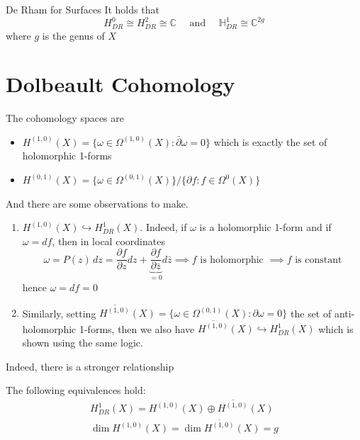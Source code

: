 \begin{theorem}{De Rham for Surfaces}
    It holds that 
    \[
      H^{0}_{DR} \cong H^2_{DR} \cong \mathbb{C} \quad \text{ and } \quad
      \mathbb{H}^{1}_{DR} \cong \mathbb{C}^{2g}
    \]
    where \(g\) is the genus of \(X\) 
\end{theorem}

\section{Dolbeault Cohomology}

The cohomology spaces are
\begin{itemize}[label = --]
    \item \(H^{{(1,0)}}{(X)} = \{\omega \in \Omega^{{(1,0)}}{(X)} :
        \bar{\partial}\omega = 0\} \) which is exactly the set of holomorphic
        1-forms
    \item \(H^{{(0,1)}}{(X)} = \{\omega \in \Omega^{{(0,1)}}{(X)}\} /
        \{\partial f : f \in \Omega^{0}{(X)}\}\) 
\end{itemize}

And there are some observations to make.

\begin{enumerate}[label = \arabic*.]
    \item \(H^{{(1,0)}}{(X)} \hookrightarrow H^{1}_{DR}{(X)} \). Indeed, if \(\omega\) is
        a holomorphic 1-form and if \(\omega = df\), then in local coordinates
        \[
          \omega = P{(z)} \, dz = \frac{\partial f}{\partial z} dz +
          \underbrace{\frac{\partial f}{\partial \bar{z}}}_{=0}  d\bar{z}
          \implies f \text{ is holomorphic } \implies f \text{ is constant}
        \]
        hence \(\omega = df = 0\) 
    \item Similarly, setting \(\overline{H^{{(1,0)}}}{(X)} = \{\omega \in
        \Omega^{{(0,1)}} {(X)} : \partial \omega = 0\} \) the set of
        anti-holomorphic 1-forms, then we also have
    \(\overline{H^{{(1,0)}}} {(X)} \hookrightarrow H^{1}_{DR}{(X)} \) which
        is shown using the same logic.
\end{enumerate}

Indeed, there is a stronger relationship

\begin{theorem}{}
    The following equivalences hold:
    \begin{align}
      H^{1}_{DR} {(X)} = H^{{(1,0)}}{(X)} \oplus \overline{H^{{(1,0)}}}{(X)}\\
    \dim H^{{(1,0)}}{(X)} = \dim
      \overline{H^{{(1,0)}}}{(X)} = g
    \end{align}    
\end{theorem}

